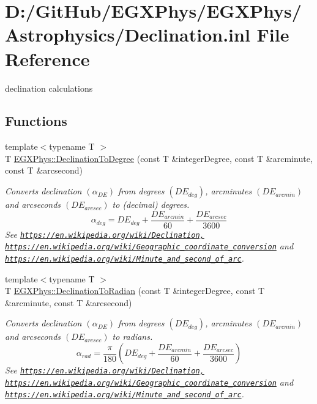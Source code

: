 \hypertarget{_declination_8inl}{}\section{D\+:/\+Git\+Hub/\+E\+G\+X\+Phys/\+E\+G\+X\+Phys/\+Astrophysics/\+Declination.inl File Reference}
\label{_declination_8inl}


declination calculations  


\subsection*{Functions}
\begin{DoxyCompactItemize}
\item 
{\footnotesize template$<$typename T $>$ }\\T \mbox{\hyperlink{group___e_g_x_phys-_astrophysics-_declination_ga6d607dacfbbdd0b1e0f18b746cabd712}{E\+G\+X\+Phys\+::\+Declination\+To\+Degree}} (const T \&integer\+Degree, const T \&arcminute, const T \&arcsecond)
\begin{DoxyCompactList}\small\item\em Converts declination $(\alpha_{DE})$ from degrees $(DE_{deg})$, arcminutes $(DE_{arcmin})$ and arcseconds $(DE_{arcsec})$ to (decimal) degrees. \[\alpha_{deg}=DE_{deg} + \frac{DE_{arcmin}}{60} + \frac{DE_{arcsec}}{3600} \] See \href{https://en.wikipedia.org/wiki/Declination,}{\tt https\+://en.\+wikipedia.\+org/wiki/\+Declination,} \href{https://en.wikipedia.org/wiki/Geographic_coordinate_conversion}{\tt https\+://en.\+wikipedia.\+org/wiki/\+Geographic\+\_\+coordinate\+\_\+conversion} and \href{https://en.wikipedia.org/wiki/Minute_and_second_of_arc}{\tt https\+://en.\+wikipedia.\+org/wiki/\+Minute\+\_\+and\+\_\+second\+\_\+of\+\_\+arc}. \end{DoxyCompactList}\item 
{\footnotesize template$<$typename T $>$ }\\T \mbox{\hyperlink{group___e_g_x_phys-_astrophysics-_declination_ga9966c20d61a2f1846a338383f695c1e5}{E\+G\+X\+Phys\+::\+Declination\+To\+Radian}} (const T \&integer\+Degree, const T \&arcminute, const T \&arcsecond)
\begin{DoxyCompactList}\small\item\em Converts declination $(\alpha_{DE})$ from degrees $(DE_{deg})$, arcminutes $(DE_{arcmin})$ and arcseconds $(DE_{arcsec})$ to radians. \[\alpha_{rad}=\frac{\pi}{180}(DE_{deg} + \frac{DE_{arcmin}}{60} + \frac{DE_{arcsec}}{3600})\] See \href{https://en.wikipedia.org/wiki/Declination,}{\tt https\+://en.\+wikipedia.\+org/wiki/\+Declination,} \href{https://en.wikipedia.org/wiki/Geographic_coordinate_conversion}{\tt https\+://en.\+wikipedia.\+org/wiki/\+Geographic\+\_\+coordinate\+\_\+conversion} and \href{https://en.wikipedia.org/wiki/Minute_and_second_of_arc}{\tt https\+://en.\+wikipedia.\+org/wiki/\+Minute\+\_\+and\+\_\+second\+\_\+of\+\_\+arc}. \end{DoxyCompactList}\item 

\end{DoxyCompactItemize}
